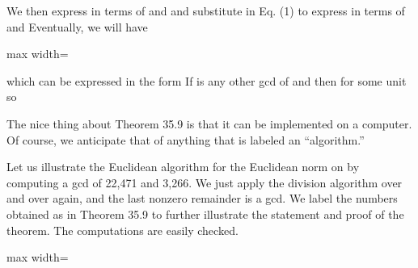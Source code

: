 \documentclass[11pt,oneside]{article}
\begin{document}
\begin{BookBody}
\noindent We then express  in terms of  and  and substitute in Eq. (1) to express  in terms of  and  Eventually, we will have

\begin{center}\begin{adjustbox}{max width=\linewidth}\end{adjustbox}\end{center}

\noindent which can be expressed in the form  If  is any other gcd of  and  then  for some unit  so \BookEnd{\blacklozenge}

The nice thing about Theorem 35.9 is that it can be implemented on a computer. Of course, we anticipate that of anything that is labeled an “algorithm.”

 Let us illustrate the Euclidean algorithm for the Euclidean norm \BookInline{||} on  by computing a gcd of 22,471 and 3,266. We just apply the division algorithm over and over again, and the last nonzero remainder is a gcd. We label the numbers obtained as in Theorem 35.9 to further illustrate the statement and proof of the theorem. The computations are easily checked.

\begin{center}\begin{adjustbox}{max width=\linewidth}\end{adjustbox}\end{center}

\end{BookBody}
\end{document}
